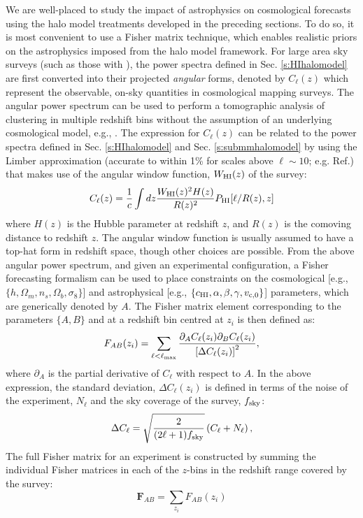 We are well-placed to study the impact of astrophysics on cosmological forecasts using the halo model treatments developed in the preceding sections. To do so, it is most convenient to \cite{hparaa2019} use a Fisher matrix technique, which enables realistic priors on the astrophysics imposed from the halo model framework. For large area sky surveys (such as those with \HI), the power spectra defined in Sec. \ref{s:HIhalomodel} are first converted into their projected \textit{angular} forms, denoted by $C_{\ell}(z)$ which represent
the observable, on-sky quantities in cosmological mapping surveys. The angular power spectrum can be used to perform a
tomographic analysis of clustering in multiple redshift bins without the 
assumption of an underlying cosmological model, e.g., \cite{seehars2016}. The expression for $C_{\ell}(z)$  can be related to the power spectra defined in Sec. \ref{s:HIhalomodel} and Sec. \ref{s:submmhalomodel} by using the  Limber approximation (accurate to within 1\% for scales above $\ell \sim 10$; e.g. Ref.\cite{limber1953}) that makes use of the angular window function, $W_{\rm HI}(z)$ of the survey:
\begin{equation}
C_{\ell} (z) = \frac{1}{c} \int dz  \frac{{W_{\rm HI}}(z)^2 
H(z)}{R(z)^2} 
P_{\rm HI} [\ell/R(z), z]
\label{cllimber}
\end{equation}
where $H(z)$ is the Hubble parameter at redshift $z$, and $R(z)$ is the comoving distance to redshift $z$. The angular window function is usually assumed to have a top-hat form in redshift space, though other choices are possible.
From the above angular power spectrum, and given an experimental configuration, 
a Fisher forecasting formalism can be used to place constraints on the 
 cosmological [e.g., $\{h, \Omega_m, n_s, \Omega_b, \sigma_8\}$]  and 
astrophysical [e.g., $\{c_{\rm HI}, \alpha, \beta, \gamma, v_{\rm c,0}\}$] 
parameters, which are generically denoted by $A$. The Fisher matrix element 
corresponding to the parameters $\{A,B\}$ and at a redshift bin centred at $z_i$ is then defined as:
\begin{equation}
F_{AB} (z_i) = \sum_{\ell < \ell_{\rm max}} \frac{\partial_A C_\ell (z_i)
\partial_B C_\ell(z_i)}{\left[\Delta C_\ell(z_i)\right]^2},
\end{equation}
where $\partial_A$ is the partial derivative of $C_{\ell}$ with respect to 
$A$. In the above expression, the standard deviation, $\Delta C_{\ell} (z_i)$ is defined 
in terms of the noise of the experiment, $N_{\ell}$ and the sky 
coverage of the survey, $f_{\rm sky}$:
\begin{equation}
\Delta C_\ell = \sqrt{\frac{2}{(2 \ell + 1)f_{\rm sky}}} 
\left(C_\ell + N_\ell\right),\label{eq:Delta_Cl}
\end{equation}
 The full Fisher matrix for an experiment is constructed by summing the individual Fisher matrices in each of the $z$-bins
in the redshift range covered by the survey: 
\begin{equation}
 \mathbf{F}_{AB} = \sum_{z_i} F_{AB}(z_i)
 \label{fisher}
\end{equation}


